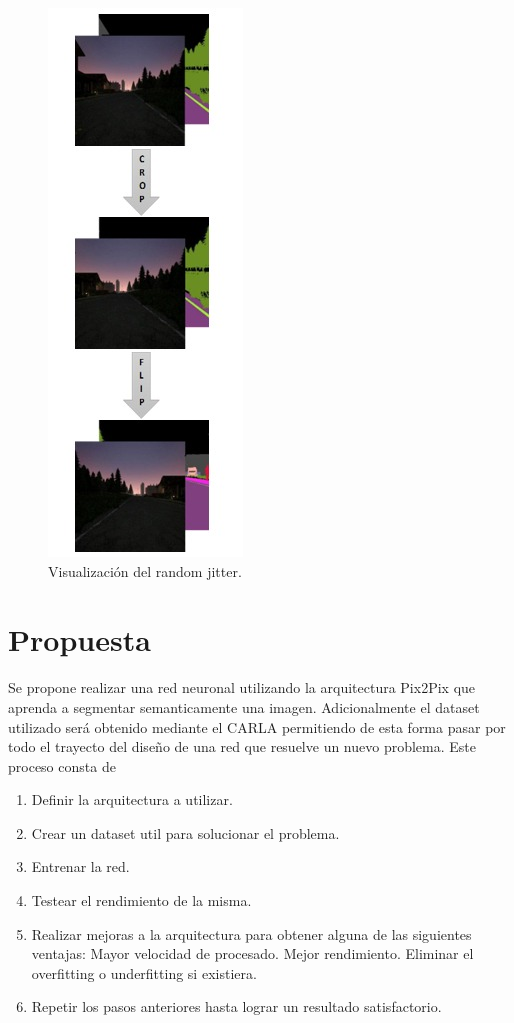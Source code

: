 \documentclass[]{IEEEtran}
\begin{document}
    \begin{figure}
        \centering
        \includegraphics[width=.25\textwidth]{Imgs/random_jitter.jpeg}
        \caption{Visualización del random jitter.}
        \label{fig:crop-flip}
    \end{figure}

    \section{Propuesta}

    Se propone realizar una red neuronal utilizando la arquitectura Pix2Pix que 
    aprenda a segmentar semanticamente una imagen. Adicionalmente el 
    dataset utilizado será obtenido mediante el CARLA permitiendo de esta forma 
    pasar por todo el trayecto del diseño de una red que resuelve un nuevo problema. 
    Este proceso consta de 

    \begin{enumerate}
        \item Definir la arquitectura a utilizar.
        \item Crear un dataset util para solucionar el problema.
        \item Entrenar la red.
        \item Testear el rendimiento de la misma.
        \item Realizar mejoras a la arquitectura para obtener alguna de las siguientes ventajas: 
            \subitem Mayor velocidad de procesado.
            \subitem Mejor rendimiento. 
            \subitem Eliminar el overfitting o underfitting si existiera.
        \item Repetir los pasos anteriores hasta lograr un resultado satisfactorio.
    \end{enumerate}
\end{document}
